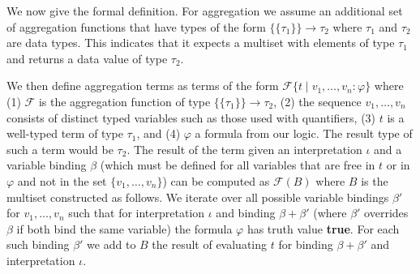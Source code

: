 \documentclass[11pt]{amsart}
\theoremstyle{definition}
\theoremstyle{remark}
\begin{document}
We now give the formal definition. For aggregation we assume an additional set of aggregation functions that have types of the form $\{\!\{ \tau_1 \}\!\} \to \tau_2$ where $\tau_1$ and $\tau_2$ are data types. This indicates that it expects a multiset with elements of type $\tau_1$ and returns a data value of type $\tau_2$.

We then define aggregation terms as terms of the form $\mathcal{F} \{ t \mid v_1, \ldots, v_n : \varphi \}$ where (1) $\mathcal{F}$ is the aggregation function of type $\{\!\{ \tau_1 \}\!\} \to \tau_2$, (2) the sequence $v_1, \ldots, v_n$ consists of distinct typed variables such as those used with quantifiers, (3) $t$ is a well-typed term of type $\tau_1$, and (4) $\varphi$ a formula from our logic. The result type of such a term would be $\tau_2$. The result of the term given an interpretation $\iota$ and a variable binding $\beta$ (which must be defined for all variables that are free in $t$ or in $\varphi$ and not in the set $\{ v_1, \ldots, v_n \}$) can be computed as $\mathcal{F}(B)$ where $B$ is the multiset constructed as follows. We iterate over all possible variable bindings $\beta'$ for $v_1, \ldots, v_n$ such that for interpretation $\iota$ and binding $\beta + \beta'$ (where $\beta'$ overrides $\beta$ if both bind the same variable) the formula $\varphi$ has truth value \textbf{true}. For each such binding $\beta'$ we add to $B$ the result of evaluating $t$ for binding $\beta + \beta'$ and interpretation $\iota$.
\end{document}
